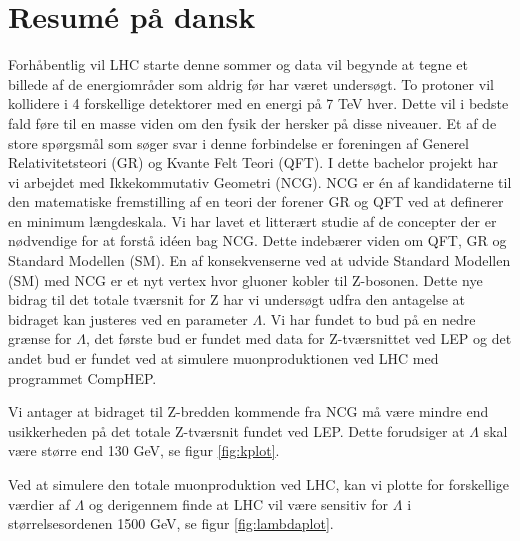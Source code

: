 \section{Resumé på dansk}
Forhåbentlig vil LHC starte denne sommer og data vil begynde at tegne et billede af de energiområder som aldrig før har været undersøgt. To protoner vil kollidere i 4 forskellige detektorer med en energi på 7 TeV hver. Dette vil i bedste fald føre til en masse viden om den fysik der hersker på disse niveauer. Et af de store spørgsmål som søger svar i denne forbindelse er foreningen af Generel Relativitetsteori (GR) og Kvante Felt Teori (QFT). I dette bachelor projekt har vi arbejdet med Ikkekommutativ Geometri (NCG). NCG er én af kandidaterne til den matematiske fremstilling af en teori der forener GR og QFT ved at definerer en minimum længdeskala. Vi har lavet et litterært studie af de concepter der er nødvendige for at forstå idéen bag NCG. Dette indebærer viden om QFT, GR og Standard Modellen (SM). En af konsekvenserne ved at udvide Standard Modellen (SM) med NCG er et nyt vertex hvor gluoner kobler til Z-bosonen. Dette nye bidrag til det totale tværsnit for Z har vi undersøgt udfra den antagelse at bidraget kan justeres ved en parameter $\Lambda$. Vi har fundet to bud på en nedre grænse for $\Lambda$, det første bud er fundet med data for Z-tværsnittet ved LEP og det andet bud er fundet ved at simulere muonproduktionen ved LHC med programmet CompHEP. 

Vi antager at bidraget til Z-bredden kommende fra NCG må være mindre end usikkerheden på det totale Z-tværsnit fundet ved LEP. Dette forudsiger at $\Lambda$ skal være større end 130 GeV, se figur \ref{fig:kplot}. 

Ved at simulere den totale muonproduktion ved LHC, kan vi plotte for forskellige værdier af $\Lambda$ og derigennem finde at LHC vil være sensitiv for $\Lambda$ i størrelsesordenen 1500 GeV, se figur \ref{fig:lambdaplot}. 
